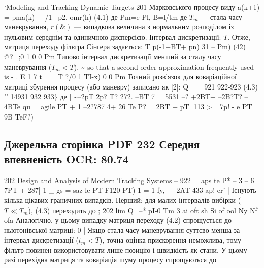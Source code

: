 \documentclass[11pt]{article}
\begin{document}
`Modeling and Tracking Dynamic Targets 201
Марковського процесу виду
a(k+1) = pma(k) + /1-- p2, omr(h) (4.1)
де
Pm=e Pl, B=l/tm
де $T_m$ — стала часу маневрування, $r(\&)$ — випадкова величина з нормальним
розподілом із нульовим середнім та одиничною дисперсією.
Інтервал дискретизації: $T$.
Отже, матриця переходу фільтра Сінгера задається:
T p(-1+BT+ pn)
31 -- Pm) (42)
]
@?=;0 1
0 0 Pm
Типово інтервал дискретизації менший за сталу часу маневрування ($T_m < T$).
\textasciitilde{} so-that a second-order approximation frequently used is -
. E
1 7 t
=\_ T
?/0 1 TI-x)
0 0 Pm
Точний розв’язок для коваріаційної матриці збурення процесу (або
маневру) записано як [2]:
Q= = 921 922-923 (4.3)
'' 14931 932 933\}
де
] \textasciitilde{}--2pT 2p? T? 272. --BT
7 = 5531 --? +2BT+ --2B?T? --4BTe
qu = agile PT + 1 --2?787 4+ 26 Te P? \_ 2BT + pT]
113 >= 7p! - e PT \_ 9B TeF?)
\clearpage\subsection*{Джерельна сторінка PDF 232 \quad Середня впевненість OCR: 80.74}
202 Design and Analysis of Modern Tracking Systems
-- 
922 = aps te P* -- 3 -- 6 7PT + 287]
1 \_
gs = saz le PT F120 PT)
1
= 1 fy, -- --2AT
433 ap! er' |
Існують кілька цікавих граничних випадків. Перший: для малих інтервалів
вибірки ($T\ll T_m$), (4.3) переходить до
; 202
lim Q=--*
pI-0 Tm
3
ai oft sh
Si of ool
Ny Nf ofa
Аналогічно, у цьому випадку матриця переходу (4.2) спрощується до ньютонівської
матриці:
0 |
Якщо стала часу маневрування суттєво менша за інтервал дискретизації
($t_m < T$), точна оцінка прискорення неможлива, тому фільтр
повинен використовувати лише позицію і швидкість як стани. У цьому разі перехідна
матриця та коваріація шуму процесу спрощуються до
\end{document}
